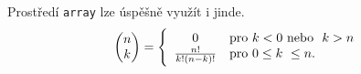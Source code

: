 \documentclass[a4paper, 11pt]{article}
\begin{document}
    Prostředí \texttt{array} lze úspěšně využít i jinde.
\begin{equation}
\begin{pmatrix}
n\\
k
\end{pmatrix}
=
\Bigg\{
\begin{array}{cl}
    0 & \textup{pro}\ k < 0\ \textup{nebo}\ \ k >  n \\
\frac{n!}{k!(n-k)!} & \textup{pro}\ 0\leq k\  \leq n. 
\end{array}    
\nonumber
\end{equation} 
\end{document}
